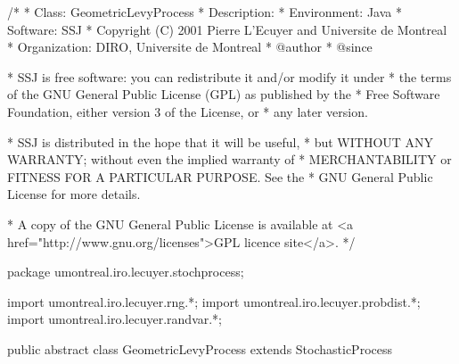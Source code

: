\begin{code}
\begin{hide}
/*
 * Class:        GeometricLevyProcess
 * Description:  
 * Environment:  Java
 * Software:     SSJ 
 * Copyright (C) 2001  Pierre L'Ecuyer and Universite de Montreal
 * Organization: DIRO, Universite de Montreal
 * @author       
 * @since

 * SSJ is free software: you can redistribute it and/or modify it under
 * the terms of the GNU General Public License (GPL) as published by the
 * Free Software Foundation, either version 3 of the License, or
 * any later version.

 * SSJ is distributed in the hope that it will be useful,
 * but WITHOUT ANY WARRANTY; without even the implied warranty of
 * MERCHANTABILITY or FITNESS FOR A PARTICULAR PURPOSE.  See the
 * GNU General Public License for more details.

 * A copy of the GNU General Public License is available at
   <a href="http://www.gnu.org/licenses">GPL licence site</a>.
 */
\end{hide}
package umontreal.iro.lecuyer.stochprocess;\begin{hide}
import umontreal.iro.lecuyer.rng.*;
import umontreal.iro.lecuyer.probdist.*;
import umontreal.iro.lecuyer.randvar.*;

\end{hide}

public abstract class GeometricLevyProcess extends StochasticProcess \begin{hide} {

    protected StochasticProcess levyProcess;
    protected double omegaRiskNeutralCorrection;
    protected double muGeom;  // usually the interest rate
    protected double[] muGeomRNdt; // risk neutral corrected 
    protected double[] muGeomRNdT; // risk neutral corrected, from time t0.

    protected void init()
    {
        super.init();
        if (observationTimesSet)
        {
            // Telling the variance gamma proc. about the observ. times
            levyProcess.setObservationTimes (t, d);

            // We need to know in which order the observations are generated
            this.observationIndexFromCounter 
                = levyProcess.getArrayMappingCounterToIndex();

            muGeomRNdt = new double[d];
            for (int i = 0; i < d; i++){
                muGeomRNdt[i] = (muGeom-omegaRiskNeutralCorrection) * 
                                (t[i+1] - t[i]);
            }
            muGeomRNdT = new double[d+1];
            for (int i = 0; i <= d; i++){
                muGeomRNdT[i] = (muGeom-omegaRiskNeutralCorrection) * 
                                (t[i] - t[0]);                
            }
        }
    }
\end{hide}
\end{code}
